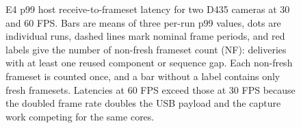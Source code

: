 \begin{figure}[t]
\centering
\resizebox{\textwidth}{!}{%
}
\caption{E4 p99 host receive-to-frameset latency for two D435 cameras at 30
and 60 FPS.  Bars are means of three per-run p99 values, dots are individual
runs, dashed lines mark nominal frame periods, and red labels give the number
of non-fresh frameset count (NF): deliveries with at least one reused component
or sequence gap.  Each non-fresh frameset is counted once, and a bar without a
label contains only fresh framesets.  Latencies at 60 FPS exceed those at
30 FPS because the doubled frame rate doubles the USB payload and the
capture work competing for the same cores.}
\label{fig:main-matrix}
\end{figure}
